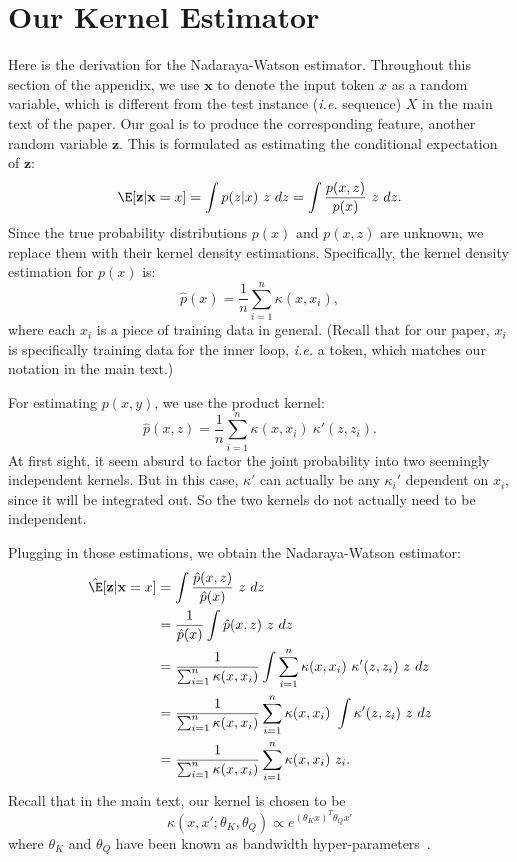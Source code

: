 \documentclass{article} %
\begin{document}

\clearpage

\section{Our Kernel Estimator}
\label{app:nwk}
Here is the derivation for the Nadaraya-Watson estimator.
Throughout this section of the appendix, we use $\mathbf{x}$ to denote the input token $x$ as a random variable, which is different from the test instance (\textit{i.e.} sequence) $X$ in the main text of the paper.
Our goal is to produce the corresponding feature, another random variable $\mathbf{z}$.
This is formulated as estimating the conditional expectation of $\mathbf{z}$:
$$
\E[\mathbf{z}|\mathbf{x} = x] = \int p(z|x)~z~dz = \int \frac{p(x, z)}{p(x)}~z~dz.
$$
Since the true probability distributions $p(x)$ and $p(x, z)$ are unknown, we replace them with their kernel density estimations.
Specifically, the kernel density estimation for $p(x)$ is:
$$
\hat{p}(x) = \frac{1}{n}\sum_{i=1}^n \kappa(x, x_i),
$$
where each $x_i$ is a piece of training data in general.
(Recall that for our paper, $x_i$ is specifically training data for the inner loop, \textit{i.e.} a token, which matches our notation in the main text.)

For estimating $p(x,y)$, we use the product kernel:
$$
\hat{p}(x, z) = \frac{1}{n}\sum_{i=1}^n \kappa(x, x_i)~\kappa'(z, z_i).
$$
At first sight, it seem absurd to factor the joint probability into two seemingly independent kernels.
But in this case, $\kappa'$ can actually be any $\kappa_i'$ dependent on $x_i$, since it will be integrated out. So the two kernels do not actually need to be independent.

Plugging in those estimations, we obtain the Nadaraya-Watson estimator:
\begin{align*}
\hat{\E}[\mathbf{z}|\mathbf{x} = x] &= \int \frac{\hat{p}(x, z)}{\hat{p}(x)}~z~dz \\
&= \frac{1}{\hat{p}(x)} \int \hat{p}(x, z)~z~dz \\
&= \frac{1}{\sum_{i=1}^n \kappa(x, x_i)} \int \sum_{i=1}^n \kappa(x, x_i)~\kappa'(z, z_i)~z~dz \\
&= \frac{1}{\sum_{i=1}^n \kappa(x, x_i)} \sum_{i=1}^n \kappa(x, x_i)~\int \kappa'(z, z_i)~z~dz \\
&= \frac{1}{\sum_{i=1}^n \kappa(x, x_i)} \sum_{i=1}^n \kappa(x, x_i) ~z_i.
\end{align*}
Recall that in the main text, our kernel is chosen to be
\begin{equation}
\kappa(x, x'; \theta_K, \theta_Q) \propto e^{(\theta_Kx)^T \theta_Qx'}
\end{equation}
where $\theta_K$ and $\theta_Q$ have been known as bandwidth hyper-parameters~\citep{williams2006gaussian}.
\end{document}
